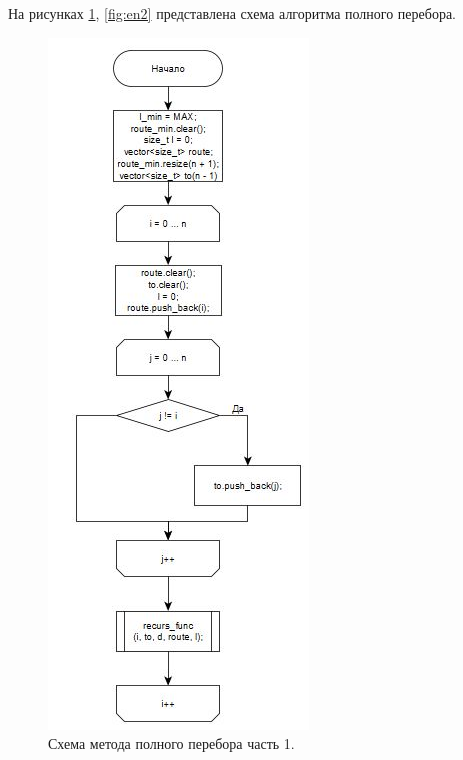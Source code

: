 \documentclass[12pt]{report}
\begin{document}
	На рисунках \ref{fig:en1}, \ref{fig:en2} представлена схема алгоритма полного перебора.
	\begin{figure}[H]
		\begin{center}
			\includegraphics[scale=1]{img/enumeration1.png}
			\caption{Схема метода полного перебора часть 1.}
			\label{fig:en1}
		\end{center}
	\end{figure}
	
\end{document}
